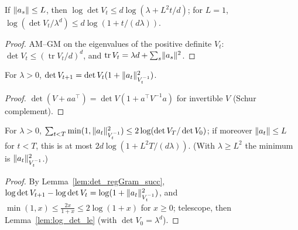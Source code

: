 \begin{lemma}
  \label{lem:log_det_le}
  \leanok
  If $\lVert a_s \rVert \le L$, then $\log \det V_t \le d \log(\lambda + L^2 t/d)$; for $L = 1$,
  $\log(\det V_t/\lambda^d) \le d \log(1 + t/(d\lambda))$.
\end{lemma}

\begin{proof}
  \leanok
  AM--GM on the eigenvalues of the positive definite $V_t$: $\det V_t \le (\operatorname{tr} V_t /
  d)^d$, and $\operatorname{tr} V_t = \lambda d + \sum_s \lVert a_s \rVert^2$.
\end{proof}

\begin{lemma}
  \label{lem:det_regGram_succ}
  \leanok
  For $\lambda > 0$, $\det V_{t+1} = \det V_t (1 + \lVert a_t \rVert^2_{V_t^{-1}})$.
\end{lemma}

\begin{proof}
  \leanok
  $\det(V + a a^\top) = \det V (1 + a^\top V^{-1} a)$ for invertible $V$ (Schur complement).
\end{proof}

\begin{lemma}
  \label{lem:elliptical_potential}
  \leanok
  For $\lambda > 0$, $\sum_{t < T} \min(1, \lVert a_t \rVert^2_{V_t^{-1}}) \le 2 \log(\det V_T/\det V_0)$;
  if moreover $\lVert a_t \rVert \le L$ for $t < T$, this is at most $2 d \log(1 + L^2 T/(d\lambda))$.
  (With $\lambda \ge L^2$ the minimum is $\lVert a_t \rVert^2_{V_t^{-1}}$.)
\end{lemma}

\begin{proof}
  \leanok
  By Lemma~\ref{lem:det_regGram_succ}, $\log \det V_{t+1} - \log \det V_t = \log(1 +
  \lVert a_t \rVert^2_{V_t^{-1}})$, and $\min(1, x) \le \frac{2x}{1 + x} \le 2 \log(1 + x)$ for $x \ge 0$;
  telescope, then Lemma~\ref{lem:log_det_le} (with $\det V_0 = \lambda^d$).
\end{proof}
